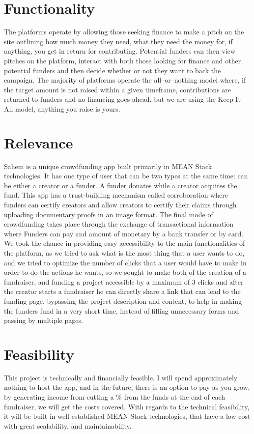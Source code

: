 \section{Functionality}
The platforms operate by allowing those seeking finance to make a pitch on the site outlining how much money they need, what they need the money for, if anything, you get in return for contributing. Potential funders can then view pitches on the platform, interact with both those looking for finance and other potential funders and then decide whether or not they want to back the campaign. The majority of platforms operate the all–or–nothing model where, if the target amount is not raised within a given timeframe, contributions are returned to funders and no financing goes ahead, but we are using the Keep It All model, anything you raise is yours.

\section{Relevance}
Sahem is a unique crowdfunding app built primarily in MEAN Stack technologies. It has one type of user that can be two types at the same time: can be either a creator or a funder. A funder donates while a creator acquires the fund. This app has a trust-building mechanism called corroboration where funders can certify creators and allow creators to certify their claims through uploading documentary proofs in an image format. The final mode of crowdfunding takes place through the exchange of transactional information where Funders can pay and amount of monetary by a bank transfer or by card.
We took the chance in providing easy accessibility to the main functionalities of the platform, as we tried to ask what is the most thing that a user wants to do, and we tried to optimize the number of clicks that a user would have to make in order to do the actions he wants, so we sought to make both of the creation of a fundraiser, and funding a project accessible by a maximum of 3 clicks and after the creator starts a fundraiser he can directly share a link that can lead to the funding page, bypassing the project description and content, to help in making the funders fund in a very short time, instead of filling unnecessary forms and passing by multiple pages.
\section{Feasibility}
This project is technically and financially feasible. I will spend approximately nothing to host the app, and in the future, there is an option to pay as you grow, by generating income from cutting a \% from the funds at the end of each fundraiser, we will get the costs covered. With regards to the technical feasibility, it will be built in well-established MEAN Stack technologies, that have a low cost with great scalability, and maintainability.

